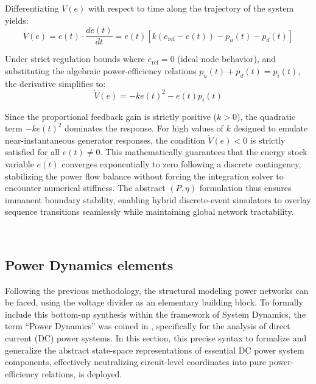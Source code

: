 \documentclass[energies,accept,oneauthor,pdftex]{Definitions/mdpi}
\begin{document}
Differentiating $V(e)$ with respect to time along the trajectory of the system yields:
\begin{equation}
    \dot{V}(e) = e(t) \cdot \frac{de(t)}{dt} = e(t) \left[ k(e_{\text{ref}} - e(t)) - p_u(t) - p_d(t) \right]
\end{equation}

Under strict regulation bounds where $e_{\text{ref}} = 0$ (ideal node behavior), and substituting the algebraic power-efficiency relations $p_u(t) + p_d(t) = p_i(t)$, the derivative simplifies to:
\begin{equation}
    \dot{V}(e) = -k e(t)^2 - e(t) p_i(t)
\end{equation}

Since the proportional feedback gain is strictly positive ($k > 0$), the quadratic term $-k e(t)^2$ dominates the response. For high values of $k$ designed to emulate near-instantaneous generator responses, the condition $\dot{V}(e) < 0$ is strictly satisfied for all $e(t) \neq 0$. This mathematically guarantees that the energy stock variable $e(t)$ converges exponentially to zero following a discrete contingency, stabilizing the power flow balance without forcing the integration solver to encounter numerical stiffness. The abstract $(P, \eta)$ formulation thus ensures immanent boundary stability, enabling hybrid discrete-event simulators to overlay sequence transitions seamlessly while maintaining global network tractability.


\vspace{4cm}

~



\subsection{Power Dynamics elements} \label{sec:power_dynamics_elements}
Following the previous methodology, the structural modeling power networks can be faced, using the voltage divider as an elementary building block. To formally include this bottom-up synthesis within the framework of System Dynamics, the term ``Power Dynamics'' was coined in \cite{gonzalezdedurana2025novel}, specifically for the analysis of direct current (DC) power systems. In this section, this precise syntax to formalize and generalize the abstract state-space representations of essential DC power system components, effectively neutralizing circuit-level coordinates into pure power-efficiency relations, is deployed.
\end{document}
